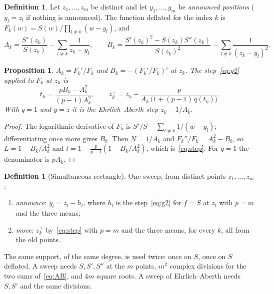 \documentclass[10pt,a4paper]{article}
\newtheorem{proposition}[theorem]{Proposition}
\theoremstyle{definition}
\newtheorem{definition}[theorem]{Definition}
\numberwithin{equation}{section}
\begin{document}
\begin{definition}\label{def:defl}
Let $z_1,\dots,z_m$ be distinct and let $y_1,\dots,y_m$ be \emph{announced positions} ($y_l=z_l$ if
nothing is announced). The function deflated for the index $k$ is
$F_k(w)=S(w)\big/\prod_{l\ne k}(w-y_l)$, and
\begin{equation}\label{eq:AB}
 A_k=\frac{S'(z_k)}{S(z_k)}-\sum_{l\ne k}\frac1{z_k-y_l},\qquad
 B_k=\frac{S'(z_k)^2-S(z_k)S''(z_k)}{S(z_k)^2}-\sum_{l\ne k}\frac1{(z_k-y_l)^2}.
\end{equation}
\end{definition}

\begin{proposition}\label{prop:step}
$A_k=F_k'/F_k$ and $B_k=-(F_k'/F_k)'$ at $z_k$. The step~\eqref{eq:g2} applied to $F_k$ at $z_k$ is
\begin{equation}\label{eq:step}
 t_k=\frac{pB_k-A_k^2}{(p-1)A_k^2},\qquad z_k^+=z_k-\frac{p}{A_k\,\bigl(1+(p-1)\,q(t_k)\bigr)} .
\end{equation}
With $q=1$ and $y=z$ it is the Ehrlich--Aberth step $z_k-1/A_k$.
\end{proposition}
\begin{proof}
The logarithmic derivative of $F_k$ is $S'/S-\sum_{l\ne k}1/(w-y_l)$; differentiating once more gives
$B_k$. Then $N=1/A_k$ and $F_k''/F_k=A_k^2-B_k$, so $L=1-B_k/A_k^2$ and
$t=1-\frac p{p-1}(1-B_k/A_k^2)$, which is~\eqref{eq:step}. For $q=1$ the denominator is $pA_k$.
\end{proof}

\begin{definition}[Simultaneous rectangle]\label{def:sweep}
One sweep, from distinct points $z_1,\dots,z_m$:
\begin{enumerate}
\item \emph{announce}: $y_l=z_l-h_l$, where $h_l$ is the step~\eqref{eq:g2} for $f=S$ at $z_l$ with
 $p=m$ and the three means;
\item \emph{move}: $z_k^+$ by~\eqref{eq:step} with $p=m$ and the three means, for every $k$, all
 from the old points.
\end{enumerate}
\end{definition}
The same support, of the same degree, is used twice: once on $S$, once on $S$ deflated. A sweep needs
$S,S',S''$ at the $m$ points, $m^2$ complex divisions for the two sums of~\eqref{eq:AB}, and $4m$
square roots. A sweep of Ehrlich--Aberth needs $S,S'$ and the same divisions.
\end{document}
